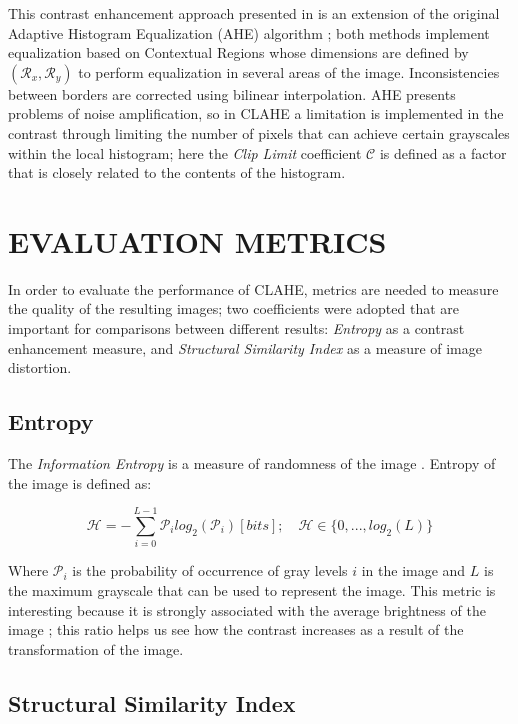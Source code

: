 \documentclass[spanish,twocolumn]{article}
\begin{document}
This contrast enhancement approach presented in \cite{Zuiderveld:1994:CLA:180895.180940} is an extension of the original Adaptive Histogram Equalization (AHE) algorithm \cite{pizer1987adaptive}; both methods implement equalization based on Contextual Regions whose dimensions are defined by $(\mathcal{R}_x, \mathcal{R}_y)$ to perform equalization in several areas of the image. Inconsistencies between borders are corrected using bilinear interpolation. AHE presents problems of noise amplification, so in CLAHE a limitation is implemented in the contrast through limiting the number of pixels that can achieve certain grayscales within the local histogram; here the {\it Clip Limit} coefficient $\mathcal{C}$ is defined as a factor that is closely related to the contents of the histogram.


\section{EVALUATION METRICS}
\label{sec:metricas}

In order to evaluate the performance of CLAHE, metrics are needed to measure the quality of the resulting images; two coefficients were adopted that are important for comparisons between different results:  {\it Entropy} as a contrast enhancement measure, and {\it Structural Similarity Index} as a measure of image distortion.  

\subsection{Entropy}
\label{ssec:entropia}

The {\it Information Entropy} is a measure of randomness of the image \cite{tsai2008information}. Entropy of the image is defined as:

\begin{equation}\label{eq:entropia}
\mathscr{H}=-\sum_{i=0}^{L-1}\mathcal{P}_i log_2(\mathcal{P}_i) [bits]; \quad \mathscr{H} \in \{0,...,log_2(L)\} 
\end{equation}

Where $\mathcal{P}_i$ is the probability of occurrence of gray levels $i$ in the image and $L$ is the maximum grayscale that can be used to represent the image. This metric is interesting because it is strongly associated with the average brightness of the image \cite{108593}; this ratio helps us see how the contrast increases as a result of the transformation of the image.

\subsection{Structural Similarity Index}
\label{ssec:ssim}
\end{document}
